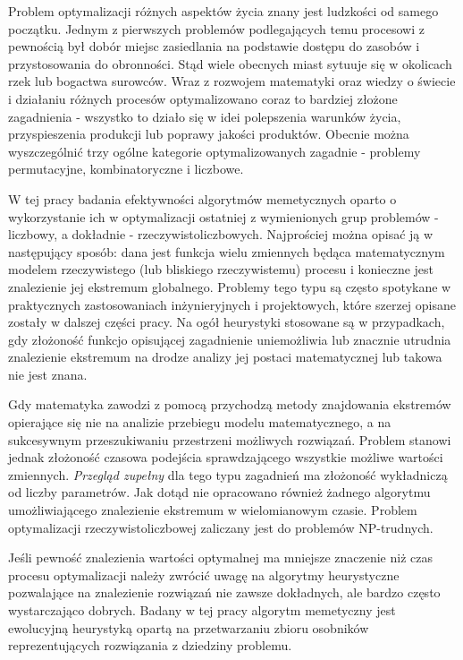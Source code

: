 \par
Problem optymalizacji różnych aspektów życia znany jest ludzkości od samego początku. Jednym z pierwszych problemów podlegających temu procesowi z pewnością był dobór miejsc zasiedlania na podstawie dostępu do zasobów i przystosowania do obronności. Stąd wiele obecnych miast sytuuje się w okolicach rzek lub bogactwa surowców. Wraz z rozwojem matematyki oraz wiedzy o świecie i działaniu różnych procesów optymalizowano coraz to bardziej złożone zagadnienia - wszystko to działo się w idei polepszenia warunków życia, przyspieszenia produkcji lub poprawy jakości produktów. Obecnie można wyszczególnić trzy ogólne kategorie optymalizowanych zagadnie - problemy permutacyjne, kombinatoryczne i liczbowe. 
\par
W tej pracy badania efektywności algorytmów memetycznych oparto o wykorzystanie ich w optymalizacji ostatniej z wymienionych grup problemów - liczbowy, a dokładnie - rzeczywistoliczbowych. Najprościej można opisać ją w następujący sposób: dana jest funkcja wielu zmiennych będąca matematycznym modelem rzeczywistego (lub bliskiego rzeczywistemu) procesu i konieczne jest znalezienie jej ekstremum globalnego. Problemy tego typu są często spotykane w praktycznych zastosowaniach inżynieryjnych i projektowych, które szerzej opisane zostały w dalszej części pracy. Na ogół heurystyki stosowane są w przypadkach, gdy złożoność funkcjo opisującej zagadnienie uniemożliwia lub znacznie utrudnia znalezienie ekstremum na drodze analizy jej postaci matematycznej lub takowa nie jest znana. 
\par
Gdy matematyka zawodzi z pomocą przychodzą metody znajdowania ekstremów opierające się nie na analizie przebiegu modelu matematycznego, a na sukcesywnym przeszukiwaniu przestrzeni możliwych rozwiązań. Problem stanowi jednak złożoność czasowa podejścia sprawdzającego wszystkie możliwe wartości zmiennych. \emph{Przegląd zupełny} dla tego typu zagadnień ma złożoność wykładniczą od liczby parametrów. Jak dotąd nie opracowano również żadnego algorytmu umożliwiającego znalezienie ekstremum w wielomianowym czasie. Problem optymalizacji rzeczywistoliczbowej zaliczany jest do problemów NP-trudnych.
\par
Jeśli pewność znalezienia wartości optymalnej ma mniejsze znaczenie niż czas procesu optymalizacji należy zwrócić uwagę na algorytmy heurystyczne pozwalające na znalezienie rozwiązań nie zawsze dokładnych, ale bardzo często wystarczająco dobrych. Badany w tej pracy algorytm memetyczny jest ewolucyjną heurystyką opartą na przetwarzaniu zbioru osobników reprezentujących rozwiązania z dziedziny problemu. 
